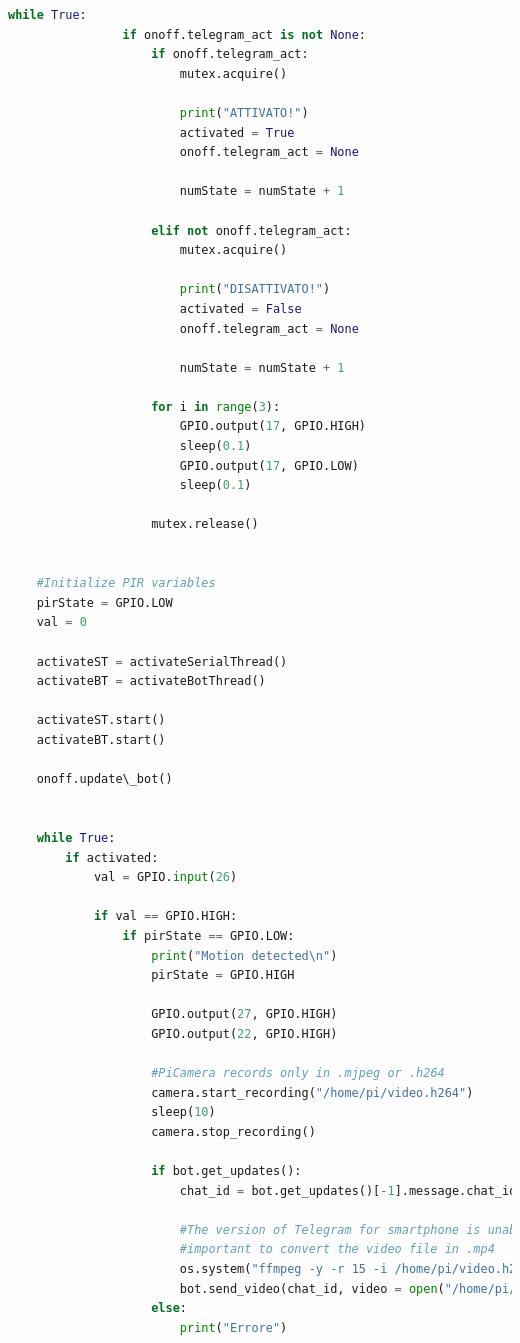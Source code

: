 \documentclass[12pt]{article}
\begin{document}
\begin{lstlisting}[language=Python]
        	while True:
            	if onoff.telegram_act is not None:
                	if onoff.telegram_act:
                    	mutex.acquire()
         
                    	print("ATTIVATO!")
                    	activated = True
                    	onoff.telegram_act = None
               
                    	numState = numState + 1
               
                	elif not onoff.telegram_act:
                    	mutex.acquire()
                   
                   	 	print("DISATTIVATO!")
                    	activated = False
                    	onoff.telegram_act = None
                    
                    	numState = numState + 1
               
                	for i in range(3):
                    	GPIO.output(17, GPIO.HIGH)
                    	sleep(0.1)
                    	GPIO.output(17, GPIO.LOW)
                    	sleep(0.1)
                
                	mutex.release()


	#Initialize PIR variables
	pirState = GPIO.LOW
	val = 0

	activateST = activateSerialThread()
	activateBT = activateBotThread()

	activateST.start()
	activateBT.start()

	onoff.update\_bot()


	while True:
    	if activated:
        	val = GPIO.input(26)

        	if val == GPIO.HIGH:
            	if pirState == GPIO.LOW:
                	print("Motion detected\n")
               	 	pirState = GPIO.HIGH
  
                	GPIO.output(27, GPIO.HIGH)
                	GPIO.output(22, GPIO.HIGH)
    
                	#PiCamera records only in .mjpeg or .h264
                	camera.start_recording("/home/pi/video.h264")
                	sleep(10)
                	camera.stop_recording()
        
                	if bot.get_updates():
                    	chat_id = bot.get_updates()[-1].message.chat_id
                   
                    	#The version of Telegram for smartphone is unable to read file.mp4 or file.h264. In order to achieve this is
                    	#important to convert the video file in .mp4
                    	os.system("ffmpeg -y -r 15 -i /home/pi/video.h264 -an -c:v copy /home/pi/video.mp4 > /dev/null 2>&1")
         	           	bot.send_video(chat_id, video = open("/home/pi/video.mp4", 'rb'), supports_streaming = True)
                	else: 
                    	print("Errore")
        

\end{lstlisting}
\end{document}
